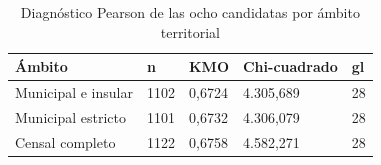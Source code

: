 \begin{table}[htbp]
\centering\small
\caption{Diagnóstico Pearson de las ocho candidatas por ámbito territorial}\label{tab:kmo_ambitos}
\begin{tabular}{@{}p{}p{}p{}p{}p{}@{}}
\toprule
Ámbito & n & KMO & Chi-cuadrado & gl \\
\midrule
Municipal e insular & 1102 & 0,6724 & 4.305,689 & 28 \\
Municipal estricto & 1101 & 0,6732 & 4.306,079 & 28 \\
Censal completo & 1122 & 0,6758 & 4.582,271 & 28 \\
\bottomrule
\end{tabular}
\end{table}
